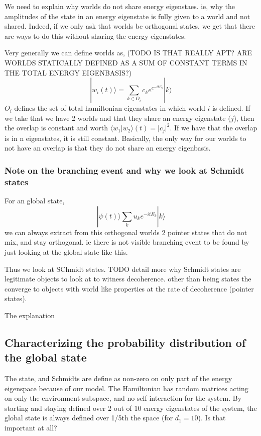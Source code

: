 \documentclass{article}
\begin{document}
We need to explain why worlds do not share energy eigenstaes. ie, why the amplitudes of the state in an energy eigenstate is fully given to a world and not shared. Indeed, if we only ask that worlds be orthogonal states, we get that there are ways to do this without sharing the energy eigenstates.

Very generally we can define worlds as, (TODO IS THAT REALLY APT? ARE WORLDS STATICALLY DEFINED AS A SUM OF CONSTANT TERMS IN THE TOTAL ENERGY EIGENBASIS?)
\begin{equation}
    |w_i(t)\rangle=\sum_{k\in O_i}c_ke^{e^{-itE_k}}|k\rangle
\end{equation}
$O_i$ defines the set of total hamiltonian eigenstates in which world $i$ is defined. If we take that we have 2 worlds and that they share an energy eigenstate ($j$), then the overlap is constant and worth $\langle w_1|w_2\rangle(t)=|c_j|^2$. If we have that the overlap is in n eigenstates, it is still constant. Basically, the only way for our worlds to not have an overlap is that they do not share an energy eigenbasis. 

\subsubsection{Note on the branching event and why we look at Schmidt states}

For an global state,
\begin{equation}
    |\psi(t)\rangle\sum_ku_ke^{-itE_k}|k\rangle
\end{equation}
we can always extract from this orthogonal worlds 2 pointer states that do not mix, and stay orthogonal. ie there is not visible branching event to be found by just looking at the global state like this. 

Thus we look at SChmidt states. TODO detail more why Schmidt states are legitimate objects to look at to witness decoherence. other than being states the converge to objects with world like properties at the rate of decoherence (pointer states).


The explanation 


\subsection{Characterizing the probability distribution of the global state}

The state, and Schmidts are define as non-zero on only part of the energy eigenspace because of our model. The Hamiltonian has random matrices acting on only the environment subspace, and no self interaction for the system. By starting and staying defined over 2 out of 10 energy eigenstates of the system, the global state is always defined over 1/5th the space (for $d_1=10$). Is that important at all? \\
\end{document}
